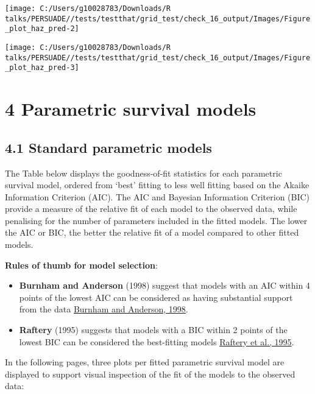 \documentclass[
]{article}
\providecommand{\tightlist}{%
  \setlength{\itemsep}{0pt}\setlength{\parskip}{0pt}}
\begin{document}
\begin{flushleft}\texttt{[image: C:/Users/g10028783/Downloads/R talks/PERSUADE//tests/testthat/grid\_test/check\_16\_output/Images/Figure\_plot\_haz\_pred-2]} \end{flushleft}

\begin{flushleft}\texttt{[image: C:/Users/g10028783/Downloads/R talks/PERSUADE//tests/testthat/grid\_test/check\_16\_output/Images/Figure\_plot\_haz\_pred-3]} \end{flushleft}

\clearpage

\section{4 Parametric survival models}\label{parametric-survival-models}

\subsection{4.1 Standard parametric
models}\label{standard-parametric-models}

The Table below displays the goodness-of-fit statistics for each
parametric survival model, ordered from `best' fitting to less well
fitting based on the Akaike Information Criterion (AIC). The AIC and
Bayesian Information Criterion (BIC) provide a measure of the relative
fit of each model to the observed data, while penalising for the number
of parameters included in the fitted models. The lower the AIC or BIC,
the better the relative fit of a model compared to other fitted models.

\textbf{Rules of thumb for model selection}:

\begin{itemize}
\tightlist
\item
  \textbf{Burnham and Anderson} (1998) suggest that models with an AIC
  within 4 points of the lowest AIC can be considered as having
  substantial support from the data
  \href{https://doi.org/10.1007/978-1-4757-2917-7}{Burnham and Anderson,
  1998}.\\
\item
  \textbf{Raftery} (1995) suggests that models with a BIC within 2
  points of the lowest BIC can be considered the best-fitting models
  \href{https://doi.org/10.2307/271063}{Raftery et al., 1995}.
\end{itemize}

In the following pages, three plots per fitted parametric survival model
are displayed to support visual inspection of the fit of the models to
the observed data:
\end{document}
